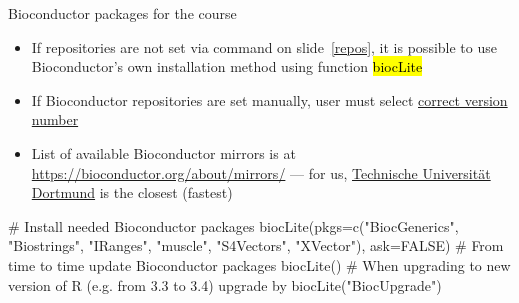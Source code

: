 \documentclass[compress, ucs, xelatex, 11pt, xcolor=svgnames,
  hyperref={
    bookmarks=true,
    unicode=true,
    colorlinks=true,
    pdftitle={Molecular data in R},
    plainpages=false,
    pdfauthor={Vojtech Zeisek},
    pdfsubject={Course about phylogeny and evolution in R},
    pdfcreator={XeLaTeX},
    pdfkeywords={R, evolution, phylogeny, molecular data},
    linkcolor=Tomato,
    anchorcolor=SaddleBrown,
    citecolor=Goldenrod,
    filecolor=DarkMagenta,
    menucolor=Sienna,
    urlcolor=DarkTurquoise,
    pdftex},
  url={hyphens, lowtilde} %
  ]{beamer}
\renewcommand{\texttt}[1]{\hl{\ttfamily #1}}
\begin{document}
\begin{frame}[fragile]{Bioconductor packages for the course}
  \begin{itemize}
    \item If repositories are not set via command on slide~\ref{repos}, it is possible to use Bioconductor's own installation method using function \texttt{biocLite}
    \item If Bioconductor repositories are set manually, user must select \href{https://bioconductor.org/install/#bioc-version}{correct version number}
    \item List of available Bioconductor mirrors is at \url{https://bioconductor.org/about/mirrors/} --- for us, \href{https://bioconductor.statistik.tu-dortmund.de/}{Technische Universität Dortmund} is the closest (fastest)
  \end{itemize}
  \begin{spluscode}
    # Install needed Bioconductor packages
    biocLite(pkgs=c("BiocGenerics", "Biostrings", "IRanges", "muscle",
      "S4Vectors", "XVector"), ask=FALSE)
    # From time to time update Bioconductor packages
    biocLite()
    # When upgrading to new version of R (e.g. from 3.3 to 3.4) upgrade by
    biocLite("BiocUpgrade")
  \end{spluscode}
\end{frame}
\end{document}
